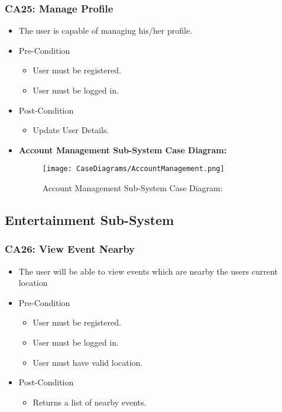 \documentclass[12pt,a4paper]{article}
\begin{document}
		\subsubsection{CA25: Manage Profile}
			\begin{itemize}
				\item The user is capable of managing his/her profile.
					\item Pre-Condition
						\begin{itemize}
							\item User must be registered.
							\item User must be logged in.
						\end{itemize}
					\item Post-Condition
						\begin{itemize}
							\item Update User Details.
						\end{itemize}
				\item \textbf{Account Management Sub-System Case Diagram:}
				\begin{figure}[H]
					\texttt{[image: CaseDiagrams/AccountManagement.png]}
					\caption{Account Management Sub-System Case Diagram:}
				\end{figure}
			\end{itemize}
	\subsection{Entertainment Sub-System}
		\subsubsection{CA26: View Event Nearby}
				\begin{itemize}
				\item The user will be able to view events which are nearby the users current location
					\item Pre-Condition
						\begin{itemize}
							\item User must be registered.
							\item User must be logged in.
							\item User must have valid location.
						\end{itemize}
					\item Post-Condition
						\begin{itemize}
							\item Returns a list of nearby events.
						\end{itemize}
				\end{itemize}
\end{document}
